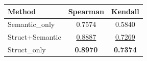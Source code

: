 \begin{tabular}{lcc}
\toprule
Method & Spearman & Kendall\\
\midrule
Semantic_only & 0.7574 & 0.5840 \\
Struct+Semantic & \underline{0.8887} & \underline{0.7269} \\
Struct_only & \textbf{0.8970} & \textbf{0.7374} \\
\bottomrule
\end{tabular}